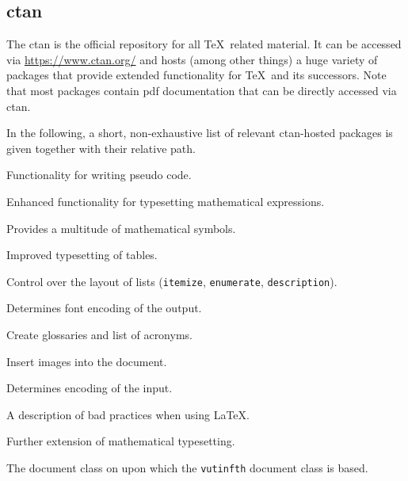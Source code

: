 \subsection[Comprehensive TeX Archive Network]{\gls{ctan}}

The \gls{ctan} is the official repository for all \TeX\ related material.
It can be accessed via \url{https://www.ctan.org/} and hosts (among other things) a huge variety of packages that provide extended functionality for \TeX\ and its successors.
Note that most packages contain \gls{pdf} documentation that can be directly accessed via \gls{ctan}.

In the following, a short, non-exhaustive list of relevant \gls{ctan}-hosted packages is given together with their relative path.
\begin{description}[itemsep=0ex]
\item[\href{https://www.ctan.org/pkg/algorithm2e}{algorithm2e}] Functionality for writing pseudo code.
\item[\href{https://www.ctan.org/pkg/amsmath}{amsmath}] Enhanced functionality for typesetting mathematical expressions.
\item[\href{https://www.ctan.org/pkg/amsfonts}{amssymb}] Provides a multitude of mathematical symbols.
\item[\href{https://www.ctan.org/pkg/booktabs}{booktabs}] Improved typesetting of tables.
\item[\href{https://www.ctan.org/pkg/enumitem}{enumitem}] Control over the layout of lists (\verb|itemize|, \verb|enumerate|, \verb|description|).
\item[\href{https://www.ctan.org/pkg/fontenc}{fontenc}] Determines font encoding of the output.
\item[\href{https://www.ctan.org/pkg/glossaries}{glossaries}] Create glossaries and list of acronyms.
\item[\href{https://www.ctan.org/pkg/graphicx}{graphicx}] Insert images into the document.
\item[\href{https://www.ctan.org/pkg/inputenc}{inputenc}] Determines encoding of the input.
\item[\href{https://www.ctan.org/pkg/l2tabu}{l2tabu}] A description of bad practices when using \LaTeX.
\item[\href{https://www.ctan.org/pkg/mathtools}{mathtools}] Further extension of mathematical typesetting.
\item[\href{https://www.ctan.org/pkg/memoir}{memoir}] The document class on upon which the \verb|vutinfth| document class is based.

\end{description}
